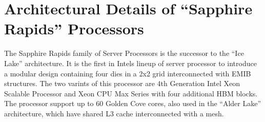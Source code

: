 \chapter{Architectural Details of ``Sapphire Rapids'' Processors}
The Sapphire Rapids family of Server Processors is the successor to the ``Ice Lake'' architecture.
It is the first in Intels lineup of server processor to introduce a modular design containing four dies in a 2x2 grid interconnected with EMIB structures.
The two varints of this processor are 4th Generation Intel Xeon Scalable Processor and Xeon CPU Max Series with four additional HBM blocks.~\cite{Intel_2021_Hotchips}
The processor support up to 60 Golden Cove cores, also used in the ``Alder Lake'' architecture, which have shared L3 cache interconnected with a mesh.